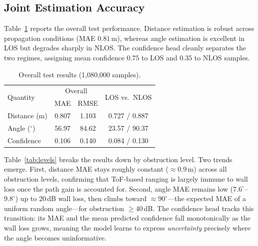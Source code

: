 \documentclass[conference]{IEEEtran}
\begin{document}
\subsection{Joint Estimation Accuracy}
Table~\ref{tab:overall} reports the overall test performance. Distance
estimation is robust across propagation conditions (MAE $0.81$\,m), whereas
angle estimation is excellent in LOS but degrades sharply in NLOS. The
confidence head cleanly separates the two regimes, assigning mean confidence
$0.75$ to LOS and $0.35$ to NLOS samples.

\begin{table}[t]
\centering
\caption{Overall test results (1,080,000 samples).}
\label{tab:overall}
\begin{tabular}{lccc}
\toprule
\multirow{2}{*}{Quantity} & \multicolumn{2}{c}{Overall} & \multirow{2}{*}{LOS vs.\ NLOS}\\
 & MAE & RMSE & \\
\midrule
Distance (m)   & 0.807 & 1.103 & 0.727 / 0.887 \\
Angle ($^{\circ}$) & 56.97 & 84.62 & 23.57 / 90.37 \\
Confidence     & 0.106 & 0.140 & 0.084 / 0.130 \\
\bottomrule
\end{tabular}
\end{table}

Table~\ref{tab:levels} breaks the results down by obstruction level. Two trends
emerge. First, distance MAE stays roughly constant ($\approx0.9$\,m) across all
obstruction levels, confirming that ToF-based ranging is largely immune to wall
loss once the path gain is accounted for. Second, angle MAE remains low
($7.6^{\circ}$--$9.8^{\circ}$) up to $20$\,dB wall loss, then climbs toward
$\approx90^{\circ}$---the expected MAE of a uniform random angle---for
obstruction $\ge40$\,dB. The confidence head tracks this transition: its MAE
and the mean predicted confidence fall monotonically as the wall loss grows,
meaning the model learns to express \emph{uncertainty} precisely where the angle
becomes uninformative.
\end{document}
